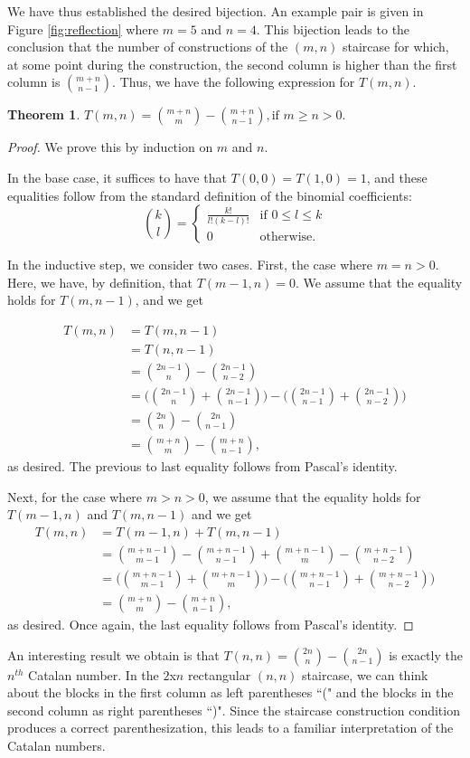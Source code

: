 \documentclass[12pt]{amsart}
\newtheorem{theorem}{Theorem}[section]
\begin{document}
We have thus established the desired bijection. An example pair is given in Figure \ref{fig:reflection} where $m=5$ and $n=4$. This bijection leads to the conclusion that the number of constructions of the $(m,n)$ staircase for which, at some point during the construction, the second column is higher than the first column is $\binom{m+n}{n-1}$. Thus, we have the following expression for $T(m,n)$.

\begin{theorem}
$T(m,n) = \binom{m+n}{m} - \binom{m+n}{n-1}, \text{if $m \geq n > 0$.}$
\end{theorem}

\begin{proof}
We prove this by induction on $m$ and $n$.

In the base case, it suffices to have that $T(0,0) = T(1,0) = 1$, and these equalities follow from the standard definition of the binomial coefficients:
$$
\binom{k}{l} =
\begin{cases}
\frac{k!}{l!(k-l)!} & \text{if } 0 \leq l \leq k \\
0 & \text{otherwise.}
\end{cases}
$$

In the inductive step, we consider two cases. First, the case where $m=n>0$. Here, we have, by definition, that $T(m-1,n)=0$. We assume that the equality holds for $T(m,n-1)$, and we get

\begin{align*}
T(m,n) & = T(m,n-1) \\
& = T(n,n-1) \\
& = \binom{2n-1}{n} - \binom{2n-1}{n-2} \\
& = \Bigg(\binom{2n-1}{n} + \binom{2n-1}{n-1}\Bigg)-\Bigg(\binom{2n-1}{n-1} + \binom{2n-1}{n-2}\Bigg) \\
& = \binom{2n}{n} - \binom{2n}{n-1} \\
& = \binom{m+n}{m} - \binom{m+n}{n-1},
\end{align*}
as desired. The previous to last equality follows from Pascal's identity.

Next, for the case where $m>n>0$, we assume that the equality holds for $T(m-1,n)$ and $T(m,n-1)$ and we get
\begin{align*}
T(m,n) & = T(m-1,n) + T(m,n-1) \\
& = \binom{m+n-1}{m-1} - \binom{m+n-1}{n-1} + \binom{m+n-1}{m} - \binom{m+n-1}{n-2} \\
& = \Bigg(\binom{m+n-1}{m-1} + \binom{m+n-1}{m}\Bigg) - \Bigg(\binom{m+n-1}{n-1} + \binom{m+n-1}{n-2}\Bigg) \\
& = \binom{m+n}{m} - \binom{m+n}{n-1},
\end{align*}
as desired. Once again, the last equality follows from Pascal's identity.
\end{proof}

An interesting result we obtain is that $T(n,n) = \binom{2n}{n} - \binom{2n}{n-1}$ is exactly the $n^{th}$ Catalan number. In the $2$x$n$ rectangular $(n,n)$ staircase, we can think about the blocks in the first column as left parentheses ``(" and the blocks in the second column as right parentheses ``)". Since the staircase construction condition produces a correct parenthesization, this leads to a familiar interpretation of the Catalan numbers. 
\end{document}
